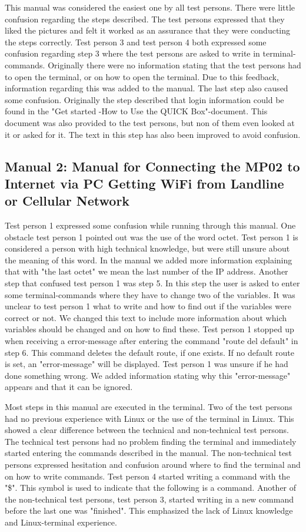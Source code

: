 This manual was considered the easiest one by all test persons. There were little confusion regarding the steps described. The test persons expressed that they liked the pictures and felt it worked as an assurance that they were conducting the steps correctly. Test person 3 and test person 4 both expressed some confusion regarding step 3 where the test persons are asked to write in terminal-commands. Originally there were no information stating that the test persons had to open the terminal, or on how to open the terminal. Due to this feedback, information regarding this was added to the manual. The last step also caused some confusion. Originally the step described that login information could be found in the "Get started -How to Use the QUICK Box"-document. This document was also provided to the test persons, but non of them even looked at it or asked for it. The text in this step has also been improved to avoid confusion. 

\subsection{Manual 2: Manual for Connecting the MP02 to Internet via PC Getting WiFi from Landline or Cellular Network}
Test person 1 expressed some confusion while running through this manual. One obstacle test person 1 pointed out was the use of the word octet. Test person 1 is considered a person with high technical knowledge, but were still unsure about the meaning of this word. In the manual we added more information explaining that with "the last octet" we mean the last number of the IP address. Another step that confused test person 1 was step 5. In this step the user is asked to enter some terminal-commands where they have to change two of the variables. It was unclear to test person 1 what to write and how to find out if the variables were correct or not. We changed this text to include more information about which variables should be changed and on how to find these. Test person 1 stopped up when receiving a error-message after entering the command "route del default" in step 6. This command deletes the default route, if one exists. If no default route is set, an "error-message" will be displayed. Test person 1 was unsure if he had done something wrong. We added information stating why this "error-message" appears and that it can be ignored. 

Most steps in this manual are executed in the terminal. Two of the test persons had no previous experience with Linux or the use of the terminal in Linux. This showed a clear difference between the technical and non-technical test persons. The technical test persons had no problem finding the terminal and immediately started entering the commands described in the manual. The non-technical test persons expressed hesitation and confusion around where to find the terminal and on how to write commands. Test person 4 started writing a command with the "\$". This symbol is used to indicate that the following is a command. Another of the non-technical test persons, test person 3, started writing in a new command before the last one was "finished". This emphasized the lack of Linux knowledge and Linux-terminal experience.   

